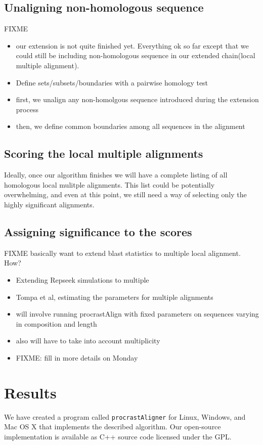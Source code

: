 \documentclass{llncs}
\begin{document}
\subsection{Unaligning non-homologous sequence}
FIXME
\begin{itemize}
\item our extension is not quite finished yet. Everything ok so far except that we could
still be including non-homologous sequence in our extended chain(local multiple alignment).
\item Define sets/subsets/boundaries with a pairwise homology test
\item first, we unalign any non-homolgous sequence introduced during the extension process
\item then, we define common boundaries among all sequences in the alignment
\end{itemize}
\subsection{Scoring the local multiple alignments}
Ideally, once our algorithm finishes we will have a complete listing of all homologous local mulitple alignments. This list could be potentially overwhelming, and even at this point, we still need a way of selecting only the highly significant alignments.

\subsection{Assigning significance to the scores}
FIXME
basically want to extend blast statistics to multiple local alignment. How?
\begin{itemize}
\item Extending Repseek simulations to multiple
\item Tompa et al, estimating the parameters for multiple alignments
\item will involve running procrastAlign with fixed parameters on sequences varying in composition and length
\item also will have to take into account multiplicity
\item FIXME: fill in more details on Monday
\end{itemize}

\section{Results}
We have created a program called \texttt{procrastAligner} for Linux,
Windows, and Mac OS X that implements the described algorithm. Our
open-source implementation is available as C++ source code licensed
under the GPL.
\end{document}
